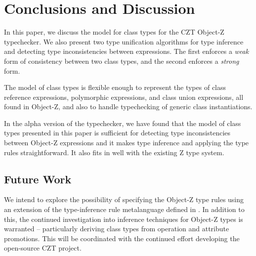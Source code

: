 \section{Conclusions and Discussion}

In this paper, we discuss the model for class types for the CZT
Object-Z typechecker. We also present two type unification algorithms
for type inference and detecting type inconsistencies between
expressions. The first enforces a {\em weak} form of consistency
between two class types, and the second enforces a {\em strong} form.

The model of class types is flexible enough to represent the types of
class reference expressions, polymorphic expressions, and class union
expressions, all found in Object-Z, and also to handle typechecking of
generic class instantiations.

In the alpha version of the typechecker, we have found that the model
of class types presented in this paper is sufficient for detecting
type inconsistencies between Object-Z expressions and it makes type
inference and applying the type rules straightforward. It also fits in
well with the existing Z type system.

\subsection{Future Work}

We intend to explore the possibility of specifying the Object-Z type rules
using an extension of the type-inference rule metalanguage defined in 
\theStandard \cite{isoz}. In addition to this, the continued investigation
into inference techniques for Object-Z types is warranted -- particularly
deriving class types from operation and attribute promotions. 
This will be coordinated with the continued effort developing the
open-source CZT project.
